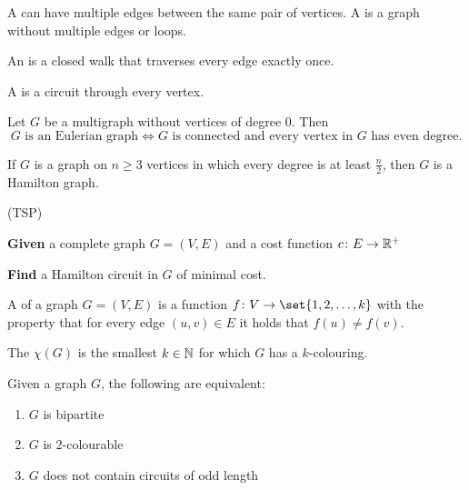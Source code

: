 \begin{definition}
    A  can have multiple edges between the same pair of vertices.
    A  is a graph without multiple edges or loops.
\end{definition}

\begin{definition}
    An  is a closed walk that traverses every edge exactly once.
\end{definition}

\begin{definition}
    A  is a circuit through every vertex.
\end{definition}

\begin{theorem}[Euler]
    Let $G$ be a multigraph without vertices of degree 0.
    Then
    \[
        \text{$G$ is an Eulerian graph} \iff \text{$G$ is connected and every vertex in $G$ has even degree.}
    \]
\end{theorem}

\begin{theorem}[Dirac]
    If $G$ is a graph on $n \ge 3$ vertices in which every degree is at least $\frac n 2$, then $G$ is a Hamilton graph.
\end{theorem}

\begin{problem} (TSP)

    \quad \textbf{Given} a complete graph $G=(V,E)$ and a cost function $c\colon E \to \mathbb{R}^+$

    \quad \textbf{Find} a Hamilton circuit in $G$ of minimal cost.
\end{problem}

\begin{definition}
    A  of a graph $G=(V,E)$ is a function $f \: V \to \set{1,2,\dots,k}$ with the property that for every edge $(u,v) \in E$ it holds that $f(u) \neq f(v)$.
\end{definition}

\begin{definition}
    The  $\chi (G)$ is the smallest $k \in \mathbb{N}$ for which $G$ has a $k$-colouring.
\end{definition}

\begin{theorem}
    Given a graph $G$, the following are equivalent:
    \begin{enumerate}
        \item $G$ is bipartite
        \item $G$ is 2-colourable
        \item $G$ does not contain circuits of odd length
    \end{enumerate}
\end{theorem}

